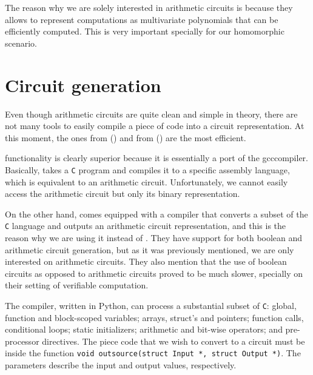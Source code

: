 The reason why we are solely interested in arithmetic circuits is because they
allows to represent computations as multivariate polynomials that can be
efficiently computed. This is very important specially for our homomorphic
scenario.

\section{Circuit generation}
Even though arithmetic circuits are quite clean and simple in theory, there are
not many tools to easily compile a piece of code into a circuit representation.
At this moment, the ones from \textcite{parno:howell:gentry:raykova:2013}
() and from \textcite{tinyram}
() are the most efficient.

\textcite{tinyram} functionality is clearly superior because it is essentially
a port of the gcc\footnotemark compiler. Basically,  takes
a \texttt{C} program and compiles it to a specific  assembly
language, which is equivalent to an arithmetic circuit. Unfortunately, we
cannot easily access the arithmetic circuit but only its binary representation.


On the other hand,  comes equipped
with a compiler that converts a subset of the \texttt{C} language and outputs
an arithmetic circuit representation, and this is the reason why we are using
it instead of .
They have support for both boolean and arithmetic circuit generation, but as it
was previously mentioned, we are only interested on arithmetic circuits. They
also mention that the use of boolean circuits as opposed to arithmetic circuits
proved to be much slower, specially on their setting of verifiable computation.

The compiler, written in Python, can process a substantial subset of
\texttt{C}: global, function and block-scoped variables; arrays, struct's and
pointers; function calls, conditional loops; static initializers; arithmetic
and bit-wise operators; and pre-processor directives. The piece code that we
wish to convert to a circuit must be inside the function \texttt{void
outsource(struct Input *, struct Output *)}. The parameters describe the input
and output values, respectively.

